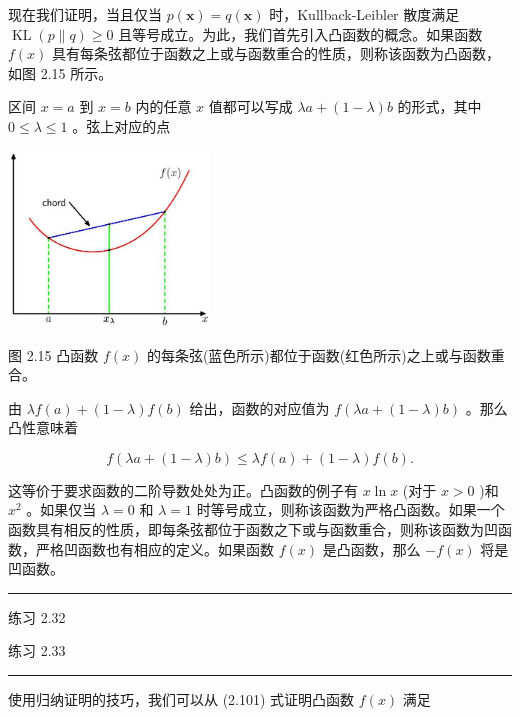 \documentclass[10pt]{article}
\newcommand{\HRule}{\begin{center}\rule{0.9\linewidth}{0.2mm}\end{center}}
\begin{document}
现在我们证明，当且仅当 \(p\left( \mathbf{x}\right)  = q\left( \mathbf{x}\right)\) 时，Kullback-Leibler 散度满足 \(\operatorname{KL}\left( {p\parallel q}\right)  \geq  0\) 且等号成立。为此，我们首先引入凸函数的概念。如果函数 \(f\left( x\right)\) 具有每条弦都位于函数之上或与函数重合的性质，则称该函数为凸函数，如图 2.15 所示。

区间 \(x = a\) 到 \(x = b\) 内的任意 \(x\) 值都可以写成 \({\lambda a} + \left( {1 - \lambda }\right) b\) 的形式，其中 \(0 \leq  \lambda  \leq  1\) 。弦上对应的点

\begin{center}
\includegraphics[max width=0.4\textwidth]{images/0194e279-9b28-703a-88f4-c3ac21e2010d_71_1002_349_543_475_0.jpg}
\end{center}
\hspace*{3em} 

图 2.15 凸函数 \(f\left( x\right)\) 的每条弦(蓝色所示)都位于函数(红色所示)之上或与函数重合。

由 \({\lambda f}\left( a\right)  + \left( {1 - \lambda }\right) f\left( b\right)\) 给出，函数的对应值为 \(f\left( {{\lambda a} + \left( {1 - \lambda }\right) b}\right)\) 。那么凸性意味着

\[
f\left( {{\lambda a} + \left( {1 - \lambda }\right) b}\right)  \leq  {\lambda f}\left( a\right)  + \left( {1 - \lambda }\right) f\left( b\right) . \tag{2.101}
\]

这等价于要求函数的二阶导数处处为正。凸函数的例子有 \(x\ln x\) (对于 \(x > 0\) )和 \({x}^{2}\) 。如果仅当 \(\lambda  = 0\) 和 \(\lambda  = 1\) 时等号成立，则称该函数为严格凸函数。如果一个函数具有相反的性质，即每条弦都位于函数之下或与函数重合，则称该函数为凹函数，严格凹函数也有相应的定义。如果函数 \(f\left( x\right)\) 是凸函数，那么 \(- f\left( x\right)\) 将是凹函数。

\HRule

练习 2.32

练习 2.33

\HRule

使用归纳证明的技巧，我们可以从 (2.101) 式证明凸函数 \(f\left( x\right)\) 满足
\end{document}

